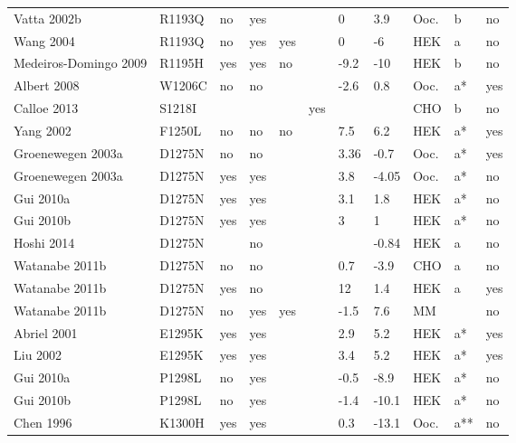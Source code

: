 \begin{tiny}
\begin{longtable}{p{4cm}|l|llll|ll|lll}
Vatta 2002b\cite{Vatta2002bMutationDB} & R1193Q & no & yes &  &  & 0 & 3.9 & Ooc. & b & no \\
Wang 2004\cite{Wang2004MutationDB} & R1193Q & no & yes & yes &  & 0 & -6 & HEK & a & no \\
Medeiros-Domingo 2009\cite{MedeirosDomingo2009MutationDB} & R1195H & yes & yes & no &  & -9.2 & -10 & HEK & b & no \\
Albert 2008\cite{Albert2008MutationDB} & W1206C & no & no &  &  & -2.6 & 0.8 & Ooc. & a* & yes \\
Calloe 2013\cite{Calloe2013MutationDB} & S1218I &  &  &  & yes &  &  & CHO & b & no \\
Yang 2002\cite{Yang2002MutationDB} & F1250L & no & no & no &  & 7.5 & 6.2 & HEK & a* & yes \\
Groenewegen 2003a\cite{Groenewegen2003aMutationDB} & D1275N & no & no &  &  & 3.36 & -0.7 & Ooc. & a* & yes \\
Groenewegen 2003a\cite{Groenewegen2003aMutationDB} & D1275N & yes & yes &  &  & 3.8 & -4.05 & Ooc. & a* & no \\
Gui 2010a\cite{Gui2010aMutationDB} & D1275N & yes & yes &  &  & 3.1 & 1.8 & HEK & a* & no \\
Gui 2010b\cite{Gui2010bMutationDB} & D1275N & yes & yes &  &  & 3 & 1 & HEK & a* & no \\
Hoshi 2014\cite{Hoshi2014MutationDB} & D1275N &  & no &  &  &  & -0.84 & HEK & a & no \\
Watanabe 2011b\cite{Watanabe2011bMutationDB} & D1275N & no & no &  &  & 0.7 & -3.9 & CHO & a & no \\
Watanabe 2011b\cite{Watanabe2011bMutationDB} & D1275N & yes & no &  &  & 12 & 1.4 & HEK & a & yes \\
Watanabe 2011b\cite{Watanabe2011bMutationDB} & D1275N & no & yes & yes &  & -1.5 & 7.6 & MM &  & no \\
Abriel 2001\cite{Abriel2001MutationDB} & E1295K & yes & yes &  &  & 2.9 & 5.2 & HEK & a* & yes \\
Liu 2002\cite{Liu2002MutationDB} & E1295K & yes & yes &  &  & 3.4 & 5.2 & HEK & a* & yes \\
Gui 2010a\cite{Gui2010aMutationDB} & P1298L & no & yes &  &  & -0.5 & -8.9 & HEK & a* & no \\
Gui 2010b\cite{Gui2010bMutationDB} & P1298L & no & yes &  &  & -1.4 & -10.1 & HEK & a* & no \\
Chen 1996\cite{Chen1996MutationDB} & K1300H & yes & yes &  &  & 0.3 & -13.1 & Ooc. & a** & no \\

\end{longtable}
\end{tiny}
